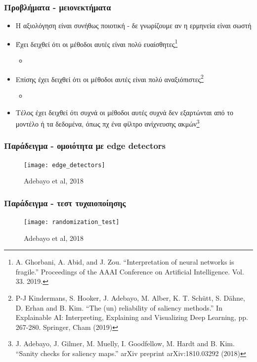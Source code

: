 \begin{frame}
  \frametitle{Προβλήματα - μειονεκτήματα}
  \begin{itemize}
  \item Η αξιολόγηση είναι συνήθως ποιοτική - δε γνωρίζουμε αν η ερμηνεία
    είναι σωστή
  \item Έχει δειχθεί ότι οι μέθοδοι αυτές είναι πολύ
    ευαίσθητες\footnote{A. Ghorbani, A. Abid, and J. Zou. ``Interpretation of
    neural networks is fragile.'' Proceedings of the AAAI Conference on
    Artificial Intelligence. Vol. 33. 2019.}
    \begin{itemize}
    \item {}
    \end{itemize}
  \item Επίσης έχει δειχθεί ότι οι μέθοδοι αυτές είναι πολύ
    αναξιόπιστες\footnote{P-J Kindermans, S. Hooker, J. Adebayo, M. Alber,
    K. T. Sch\"{u}tt,  S. D\"{a}hne, D. Erhan and B. Kim. ``The (un)
    reliability of saliency methods.'' In Explainable AI: Interpreting,
    Explaining and Visualizing Deep Learning, pp. 267-280. Springer, Cham
    (2019)}
    \begin{itemize}
    \item {}
    \end{itemize}
  \item Τέλος έχει δειχθεί ότι συχνά οι μέθοδοι αυτές συχνά δεν εξαρτώνται
    από το μοντέλο ή τα δεδομένα, όπως πχ ένα φίλτρο ανίχνευσης
    ακμών\footnote{J. Adebayo, J. Gilmer, M. Muelly, I. Goodfellow, M. Hardt
    and B. Kim. ``Sanity checks for saliency maps.'' arXiv preprint
    arXiv:1810.03292 (2018)} 
  \end{itemize}
\end{frame}

\begin{frame}
  \frametitle{Παράδειγμα - ομοιότητα με edge detectors}
  \begin{figure}
    \texttt{[image: edge\_detectors]}
    \caption{\footnotesize Adebayo et al, 2018}
  \end{figure}
\end{frame}

\begin{frame}
  \frametitle{Παράδειγμα - τεστ τυχαιοποίησης}
  \begin{figure}
    \texttt{[image: randomization\_test]}
    \caption{\footnotesize Adebayo et al, 2018}
  \end{figure}
\end{frame}

